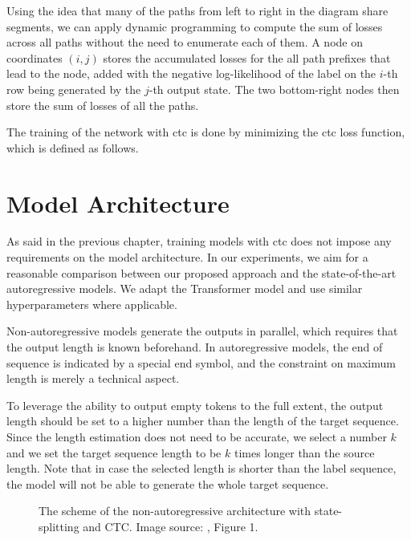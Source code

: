Using the idea that many of the paths from left to right in the diagram share
segments, we can apply dynamic programming to compute the sum of losses across
all paths without the need to enumerate each of them. A node on coordinates
$(i,j)$ stores the accumulated losses for the all path prefixes that lead to
the node, added with the negative log-likelihood of the label on the $i$-th row
being generated by the $j$-th output state. The two bottom-right nodes then
store the sum of losses of all the paths.


 The training of the network with \ac{ctc} is done by minimizing
the \ac{ctc} loss function, which is defined as follows.

\section{Model Architecture}
\label{sec:ctc:arch}

As said in the previous chapter, training models with \ac{ctc} does not impose
any requirements on the model architecture. In our experiments, we aim for a
reasonable comparison between our proposed approach and the state-of-the-art
autoregressive models. We adapt the Transformer model and use similar
hyperparameters where applicable.

Non-autoregressive models generate the outputs in parallel, which requires that
the output length is known beforehand. In autoregressive models, the end of
sequence is indicated by a special end symbol, and the constraint on maximum
length is merely a technical aspect.

To leverage the ability to output empty tokens to the full extent, the output
length should be set to a higher number than the length of the target sequence.
Since the length estimation does not need to be accurate, we select a number
$k$ and we set the target sequence length to be $k$ times longer than the
source length. Note that in case the selected length is shorter than the label
sequence, the model will not be able to generate the whole target sequence.

\begin{figure}
  \centering
  

  \caption{The scheme of the non-autoregressive architecture with
    state-splitting and CTC. Image source: \citet{libovicky-helcl-2018-end},
    Figure 1.}%
  \label{fig:state-splitting}
\end{figure}


